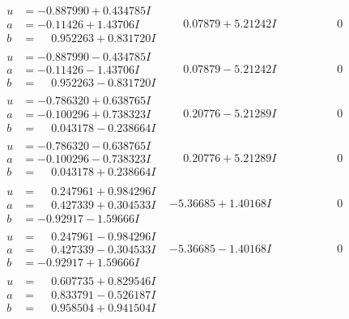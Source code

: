 \documentclass[1p]{elsarticle_modified}
\theoremstyle{definition}
\begin{document}
$$\begin{array}{c|c|c}
\begin{aligned}
u &= -0.887990 + 0.434785 I \\
a &= -0.11426 + 1.43706 I \\
b &= \phantom{-}0.952263 + 0.831720 I\end{aligned}
 & \phantom{-}0.07879 + 5.21242 I & \phantom{-0.000000 } 0 \\ \hline\begin{aligned}
u &= -0.887990 - 0.434785 I \\
a &= -0.11426 - 1.43706 I \\
b &= \phantom{-}0.952263 - 0.831720 I\end{aligned}
 & \phantom{-}0.07879 - 5.21242 I & \phantom{-0.000000 } 0 \\ \hline\begin{aligned}
u &= -0.786320 + 0.638765 I \\
a &= -0.100296 + 0.738323 I \\
b &= \phantom{-}0.043178 - 0.238664 I\end{aligned}
 & \phantom{-}0.20776 - 5.21289 I & \phantom{-0.000000 } 0 \\ \hline\begin{aligned}
u &= -0.786320 - 0.638765 I \\
a &= -0.100296 - 0.738323 I \\
b &= \phantom{-}0.043178 + 0.238664 I\end{aligned}
 & \phantom{-}0.20776 + 5.21289 I & \phantom{-0.000000 } 0 \\ \hline\begin{aligned}
u &= \phantom{-}0.247961 + 0.984296 I \\
a &= \phantom{-}0.427339 + 0.304533 I \\
b &= -0.92917 - 1.59666 I\end{aligned}
 & -5.36685 + 1.40168 I & \phantom{-0.000000 } 0 \\ \hline\begin{aligned}
u &= \phantom{-}0.247961 - 0.984296 I \\
a &= \phantom{-}0.427339 - 0.304533 I \\
b &= -0.92917 + 1.59666 I\end{aligned}
 & -5.36685 - 1.40168 I & \phantom{-0.000000 } 0 \\ \hline\begin{aligned}
u &= \phantom{-}0.607735 + 0.829546 I \\
a &= \phantom{-}0.833791 - 0.526187 I \\
b &= \phantom{-}0.958504 + 0.941504 I\end{aligned}

\end{array}$$
\end{document}

